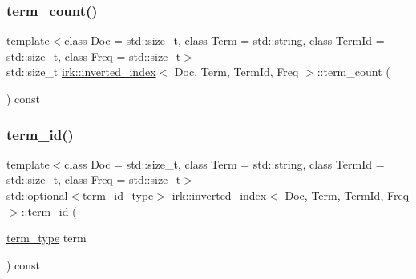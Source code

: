 \mbox{\label{classirk_1_1inverted__index_a5ae0fe7ce408b154daeadcca6a879ca7}} 
\subsubsection{\texorpdfstring{term\+\_\+count()}{term\_count()}}
{\footnotesize\ttfamily template$<$class Doc  = std\+::size\+\_\+t, class Term  = std\+::string, class Term\+Id  = std\+::size\+\_\+t, class Freq  = std\+::size\+\_\+t$>$ \\
std\+::size\+\_\+t \mbox{\hyperlink{classirk_1_1inverted__index}{irk\+::inverted\+\_\+index}}$<$ Doc, Term, Term\+Id, Freq $>$\+::term\+\_\+count (\begin{DoxyParamCaption}{ }\end{DoxyParamCaption}) const\hspace{0.3cm}{\ttfamily [inline]}}

\mbox{\label{classirk_1_1inverted__index_accd0efb6f27eea7853d45548a6bb0e7d}} 
\subsubsection{\texorpdfstring{term\+\_\+id()}{term\_id()}}
{\footnotesize\ttfamily template$<$class Doc  = std\+::size\+\_\+t, class Term  = std\+::string, class Term\+Id  = std\+::size\+\_\+t, class Freq  = std\+::size\+\_\+t$>$ \\
std\+::optional$<$\mbox{\hyperlink{classirk_1_1inverted__index_aac7579f5261c795a6f19a7f700b57b2b}{term\+\_\+id\+\_\+type}}$>$ \mbox{\hyperlink{classirk_1_1inverted__index}{irk\+::inverted\+\_\+index}}$<$ Doc, Term, Term\+Id, Freq $>$\+::term\+\_\+id (\begin{DoxyParamCaption}\item[{\mbox{\hyperlink{classirk_1_1inverted__index_a7a60c2cec1774c08f21e8e27ccb5ac33}{term\+\_\+type}}}]{term }\end{DoxyParamCaption}) const\hspace{0.3cm}{\ttfamily [inline]}}

